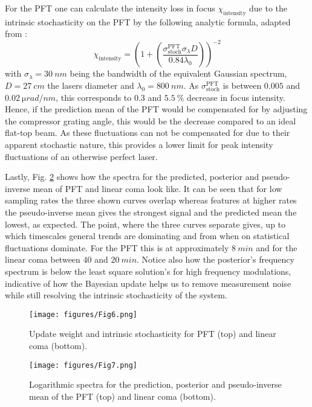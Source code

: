 \documentclass[9pt, twocolumn,superscriptaddress]{revtex4}
\begin{document}
For the PFT one can calculate the intensity loss in focus $\chi_\text{intensity}$ due to the intrinsic stochasticity on the PFT by the following analytic formula, adapted from \cite{pretzler2000angular}:
\begin{equation}
\chi_\text{intensity}= \left(1+\left( \frac{\sigma_\text{stoch}^\text{PFT}\sigma_\lambda D}{0.84\lambda_0}\right)\right)^{-2}
\end{equation}
with $\sigma_\lambda = \SI{30}{nm}$ being the bandwidth of the equivalent Gaussian spectrum, $D = \SI{27}{cm}$ the lasers diameter and $\lambda_0 = \SI{800}{nm}$. As $\sigma_\text{stoch}^\text{PFT}$ is between $0.005$ and $\SI{0.02}{\micro rad/nm}$, this corresponds to $0.3$ and $\SI{5.5}{\%}$ decrease in focus intensity. Hence, if the prediction mean of the PFT would be compensated for by adjusting the compressor grating angle, this would be the decrease compared to an ideal flat-top beam. As these fluctuations can not be compensated for due to their apparent stochastic nature, this provides a lower limit for peak intensity fluctuations of an otherwise perfect laser.

Lastly, Fig. \ref{fig:Spectral_response_plot} shows how the spectra for the predicted, posterior and pseudo-inverse mean of PFT and linear coma look like. It can be seen that for low sampling rates the three shown curves overlap whereas features at higher rates the pseudo-inverse mean gives the strongest signal and the predicted mean the lowest, as expected. The point, where the three curves separate gives, up to which timescales general trends are dominating and from when on statistical fluctuations dominate. For the PFT this is at approximately $\SI{8}{min}$ and for the linear coma between 40 and $\SI{20}{min}$. Notice also how the posterior's frequency spectrum is below the least square solution's for high frequency modulations, indicative of how the Bayesian update helps us to remove measurement noise while still resolving the intrinsic stochasticity of the system.


\begin{figure}[]
    \centering
    \texttt{[image: figures/Fig6.png]}
    \caption{Update weight and intrinsic stochasticity for PFT (top) and linear coma (bottom).}
    \label{fig:Kalman_gain_plot}
\end{figure}
\begin{figure}[]
    \centering
    \texttt{[image: figures/Fig7.png]}
    \caption{Logarithmic spectra for the prediction, posterior and pseudo-inverse mean of the PFT (top) and linear coma (bottom).}
    \label{fig:Spectral_response_plot}
\end{figure}
\end{document}
